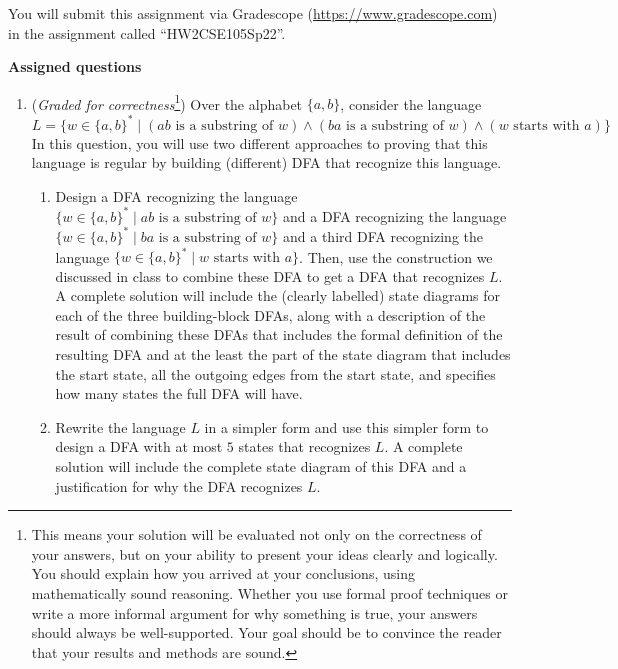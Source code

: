 \instructions

You will submit this assignment via Gradescope
(\href{https://www.gradescope.com}{https://www.gradescope.com}) 
in the assignment called ``HW2CSE105Sp22''.

{\bf Assigned questions}


\begin{enumerate}
\item ({\it Graded for correctness}\footnote{This means your solution will be
evaluated not only on the correctness of your answers, but on your ability to 
present your ideas clearly and logically. You should explain how you arrived at 
your conclusions, using 
mathematically sound reasoning. Whether you use formal proof techniques or 
write a more informal argument for why 
something is true, your answers should always be well-supported. Your goal 
should be to convince the reader that 
your results and methods are sound.}) Over the alphabet $\{a,b\}$, consider the language
\[
    L = \{ w \in \{a,b\}^* \mid (ab \textrm{ is a substring of $w$}) \land (ba \textrm{ is a substring of $w$})
    \land (w \textrm{ starts with } a)\}
\]
In this question, you will use two different approaches to proving that this language is 
regular by building (different) DFA that recognize this language.
\begin{enumerate}
    \item Design a DFA recognizing the language $\{ w \in \{a,b\}^* \mid ab \textrm{ is a substring of $w$}\}$
    and a DFA recognizing the language $\{ w \in \{a,b\}^* \mid ba \textrm{ is a substring of $w$}\}$
    and a third DFA recognizing the language $\{ w \in \{a,b\}^* \mid w \textrm{ starts with } a\}$. Then, 
    use the construction we discussed in class to combine these DFA to get a DFA that recognizes
    $L$. A complete solution will include the (clearly labelled) state diagrams for each 
    of the three building-block DFAs, along with a description of the result of combining these DFAs that includes
    the formal definition of the resulting DFA and 
    at the least the part of the state diagram that includes the start state, all the outgoing edges
    from the start state, and specifies
    how many states the full DFA will have.
    \item Rewrite the language $L$ in a simpler form and use this simpler form to design a DFA with at most
    $5$ states that recognizes $L$. A complete solution will include the complete state diagram 
    of this DFA and a justification for why the DFA recognizes $L$.
\end{enumerate}


\end{enumerate}

